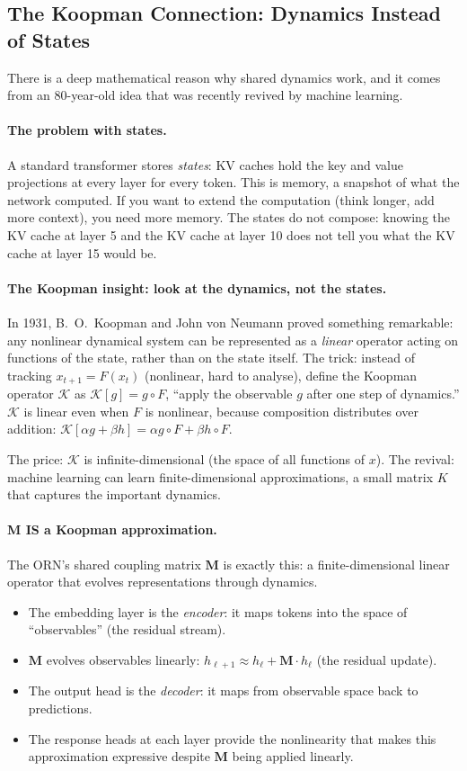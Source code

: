 \documentclass[11pt, a4paper]{article}
\newcommand{\M}{\mathbf{M}}
\theoremstyle{remark}
\begin{document}
\subsection{The Koopman Connection: Dynamics Instead of States}

There is a deep mathematical reason why shared dynamics work, and it comes from an 80-year-old idea that was recently revived by machine learning.

\paragraph{The problem with states.}
A standard transformer stores \emph{states}: KV caches hold the key and value projections at every layer for every token.
This is memory, a snapshot of what the network computed.
If you want to extend the computation (think longer, add more context), you need more memory.
The states do not compose: knowing the KV cache at layer 5 and the KV cache at layer 10 does not tell you what the KV cache at layer 15 would be.

\paragraph{The Koopman insight: look at the dynamics, not the states.}
In 1931, B.~O.~Koopman and John von Neumann proved something remarkable: any nonlinear dynamical system can be represented as a \emph{linear} operator acting on functions of the state, rather than on the state itself.
The trick: instead of tracking $x_{t+1} = F(x_t)$ (nonlinear, hard to analyse), define the Koopman operator $\mathcal{K}$ as $\mathcal{K}[g] = g \circ F$, ``apply the observable $g$ after one step of dynamics.''
$\mathcal{K}$ is linear even when $F$ is nonlinear, because composition distributes over addition: $\mathcal{K}[\alpha g + \beta h] = \alpha g \circ F + \beta h \circ F$.

The price: $\mathcal{K}$ is infinite-dimensional (the space of all functions of $x$).
The revival: machine learning can learn finite-dimensional approximations, a small matrix $K$ that captures the important dynamics.

\paragraph{M IS a Koopman approximation.}
The ORN's shared coupling matrix $\M$ is exactly this: a finite-dimensional linear operator that evolves representations through dynamics.
\begin{itemize}[nosep]
    \item The embedding layer is the \emph{encoder}: it maps tokens into the space of ``observables'' (the residual stream).
    \item $\M$ evolves observables linearly: $h_{\ell+1} \approx h_\ell + \M \cdot h_\ell$ (the residual update).
    \item The output head is the \emph{decoder}: it maps from observable space back to predictions.
    \item The response heads at each layer provide the nonlinearity that makes this approximation expressive despite $\M$ being applied linearly.
\end{itemize}
\end{document}
